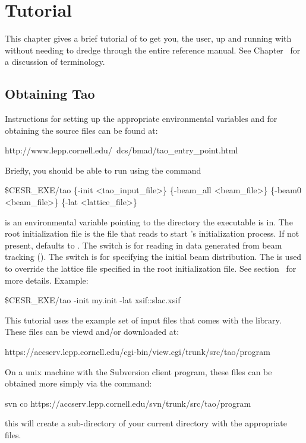 \chapter{Tutorial}
\label{c:tutorial}

This chapter gives a brief tutorial of \tao to get you, the user, up
and running with \tao without needing to dredge through the entire
reference manual. See Chapter~ for a discussion of
\tao terminology.

\section{Obtaining Tao}
\label{s:obtaining}

Instructions for setting up the appropriate environmental variables
and for obtaining the source files can be found at:
\begin{example}
  http://www.lepp.cornell.edu/~dcs/bmad/tao_entry_point.html
\end{example}

Briefly, you should be able to run \tao using the command
\begin{example}
  \$CESR_EXE/tao \{-init <tao_input_file>\} \{-beam_all <beam_file>\} 
                                  \{-beam0 <beam_file>\} \{-lat <lattice_file>\}
\end{example}
 is an environmental variable pointing to the directory
the \tao executable is in.  The root initialization file
 is the file that \tao reads to start \tao's
initialization process. If not present,  defaults
to . The  switch is for reading in data
generated from beam tracking (). The 
switch is for specifying the initial beam distribution.  The
 is used to override the lattice file specified in
the root initialization file. See section~ for
more details. Example:
\begin{example}
  \$CESR_EXE/tao -init my.init -lat xsif::slac.xsif
\end{example}

This tutorial uses the example set of input files that comes with the \tao library.
These files can be viewd and/or downloaded at:
\begin{example}
  https://accserv.lepp.cornell.edu/cgi-bin/view.cgi/trunk/src/tao/program
\end{example}
On a unix machine with the Subversion  client program, 
these files can be obtained more simply via the command:
\begin{example}
  svn co https://accserv.lepp.cornell.edu/svn/trunk/src/tao/program
\end{example}
this will create a sub-directory  of your current directory with 
the appropriate files.

